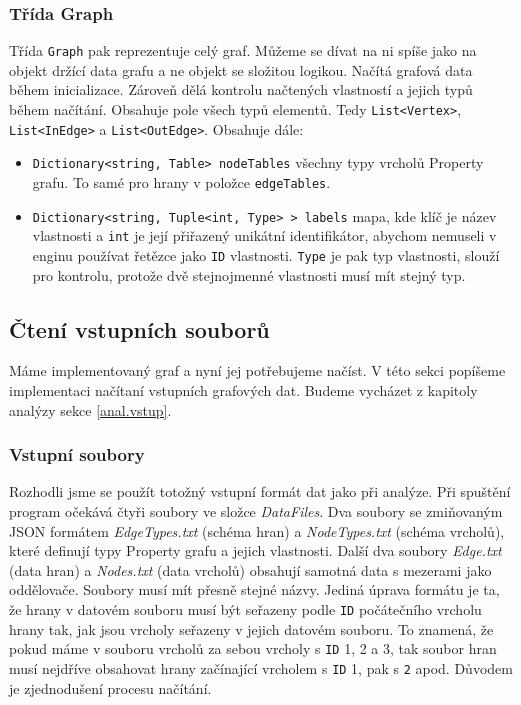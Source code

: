 \subsubsection{Třída Graph}

Třída \texttt{Graph} pak reprezentuje celý graf.
Můžeme se dívat na ni spíše jako na objekt držící data grafu a ne objekt se složitou logikou.
Načítá grafová data během inicializace.
Zároveň dělá kontrolu načtených vlastností a jejich typů během načítání.
Obsahuje pole všech typů elementů. Tedy \texttt{List<Vertex>}, \texttt{List<InEdge>} a \texttt{List<OutEdge>}.
Obsahuje dále:
\begin{itemize}
\item \texttt{Dictionary<string, Table> nodeTables} všechny typy vrcholů Property grafu. To samé pro hrany v položce \texttt{edgeTables}.
\item \texttt{Dictionary<string, Tuple<int, Type> > labels} mapa, kde klíč je název vlastnosti a \texttt{int} je její přiřazený unikátní identifikátor, abychom nemuseli v enginu používat řetězce jako \texttt{ID} vlastnosti.
\texttt{Type} je pak typ vlastnosti, slouží pro kontrolu, protože dvě stejnojmenné vlastnosti musí mít stejný typ. 
\end{itemize}


\subsection{Čtení vstupních souborů} \label{impl.vstup}

Máme implementovaný graf a nyní jej potřebujeme načíst.
V této sekci popíšeme implementaci načítaní vstupních grafových dat.
Budeme vycházet z kapitoly analýzy sekce \ref{anal.vstup}.

\subsubsection{Vstupní soubory}

Rozhodli jsme se použít totožný vstupní formát dat jako při analýze.
Při spuštění program očekává čtyři soubory ve složce \textit{DataFiles}.
Dva soubory se zmiňovaným JSON formátem \textit{EdgeTypes.txt} (schéma hran) a \textit{NodeTypes.txt} (schéma vrcholů), které definují typy Property grafu a jejich vlastnosti.
Další dva soubory \textit{Edge.txt} (data hran) a \textit{Nodes.txt} (data vrcholů) obsahují samotná data s mezerami jako oddělovače.
Soubory musí mít přesně stejné názvy.
Jediná úprava formátu je ta, že hrany v datovém souboru musí být seřazeny podle \texttt{ID} počátečního vrcholu hrany tak, jak jsou vrcholy seřazeny v jejich datovém souboru.
To znamená, že pokud máme v souboru vrcholů za sebou vrcholy s \texttt{ID} 1, 2 a 3, tak soubor hran musí nejdříve obsahovat hrany začínající vrcholem s \texttt{ID} 1, pak s \texttt{2} apod.
Důvodem je zjednodušení procesu načítání.

